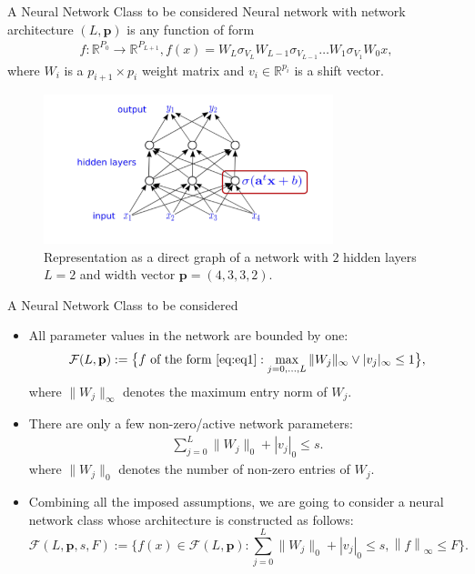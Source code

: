 \documentclass{if-beamer}
\begin{document}
\begin{frame}{A Neural Network Class to be considered}
    Neural network with network architecture $(L,\textbf{p})$ is any function of form
    \begin{eqnarray}\label{eq:eq1} 
            f:\mathbb{R}^{P_0}\rightarrow{\mathbb{R}^{P_{L+1}}}, f(x)=W_L\sigma_{V_{L}}W_{L-1}\sigma_{V_{L-1}}\dots W_1\sigma_{V_{1}}W_0x,
    \end{eqnarray}
    where $W_i$ is a $p_{i+1}\times p_{i}$ weight matrix and $v_i \in \mathbb{R}^{p_i}$ is a shift vector. 

    \begin{figure}[htbp]
        \includegraphics[width=0.75\textwidth]{Network_architecture.png}
        \caption{ Representation as a direct graph of a network with $2$ hidden layers $L=2$ and width vector $\textbf{p}=(4,3,3,2)$.  }
        \label{fig:figure1}
    \end{figure}
\end{frame}

\begin{frame}{A Neural Network Class to be considered}
    \begin{itemize}
        \item All parameter values in the network are bounded by one:
        \begin{eqnarray*}
            \mathcal{F}(L,\textbf{p}):=\big\{ f \mbox{ of the form } \eqref{eq:eq1} : \max_{j=0,\dots,L}\|W_j\|_{\infty} \vee |v_j|_{\infty} \leq 1 \big\},
        \end{eqnarray*}
        where $\|W_j\|_{\infty}$ denotes the maximum entry norm of $W_j$.
        
        \item There are only a few non-zero/active network parameters: 
        \begin{eqnarray*}
            \sum^{L}_{j=0}\|W_j\|_{0} + |v_j|_{0} \leq s.
        \end{eqnarray*}
        where $\|W_j\|_{0}$ denotes the number of non-zero entries of $W_j$.

        \item Combining all the imposed assumptions, we are going to consider a neural network class whose architecture is constructed as follows: 
        \begin{equation*}
            \mathcal{F}(L,\textbf{p},s,F)
            :=\bigg\{ f(x) \in \mathcal{F}(L,\textbf{p}) : \sum^{L}_{j=0}\|W_j\|_{0}+
            |v_j|_{0} \leq s, \left\| f \right\|_{\infty} \leq F \bigg\}.
        \end{equation*}
    \end{itemize}
\end{frame}
\end{document}
